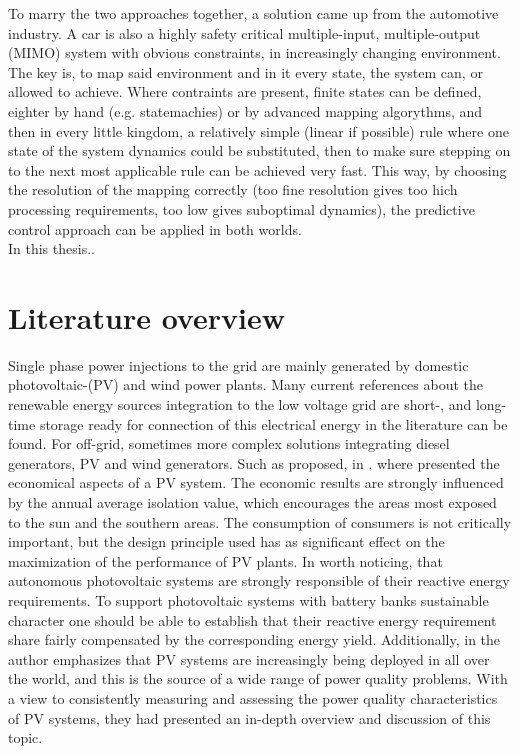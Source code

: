 To marry the two approaches together, a solution came up from the automotive industry. A car is also a highly safety critical multiple-input, multiple-output (MIMO) system with obvious constraints, in increasingly changing environment. The key is, to map said environment and in it every state, the system can, or allowed to achieve. Where contraints are present, finite states can be defined, eighter by hand (e.g. statemachies) or by advanced mapping algorythms, and then in every little kingdom, a relatively simple (linear if possible)  rule where one state of the system dynamics could be substituted, then to make sure stepping on to the next most applicable rule can be achieved very fast. This way, by choosing the resolution of the mapping correctly (too fine resolution gives too hich processing requirements, too low gives suboptimal dynamics), the predictive control approach can be applied in both worlds.\\
In this thesis..


\section{Literature overview}

Single phase power injections to the grid are mainly generated by domestic photovoltaic-(PV) and wind power plants. Many current references about the renewable energy sources integration to the low voltage grid are short-, and long-time storage ready for connection of this electrical energy in the literature can be found. For off-grid, sometimes more complex solutions integrating diesel generators, PV and wind generators. Such as proposed, in \cite{shezan2016}. \cite{cucchiella2013environmental} where presented the economical aspects of a PV system. The economic results are strongly influenced by the annual average isolation value, which encourages the areas most exposed to the sun and the southern areas. The consumption of consumers is not critically important, but the design principle used has as significant effect on the maximization of the performance of PV plants. In \cite{kaldellis2009optimum} worth noticing, that autonomous photovoltaic systems are strongly responsible of their reactive energy requirements. To support photovoltaic systems with battery banks sustainable character one should be able to establish that their reactive energy requirement share fairly compensated by the corresponding energy yield.  Additionally, in \cite{ortega2013measurement} the author emphasizes that PV systems are increasingly being deployed in all over the world, and this is the source of a wide range of power quality problems. With a view to consistently measuring and assessing the power quality characteristics of PV systems, they had presented an in-depth overview and discussion of this topic.\\

